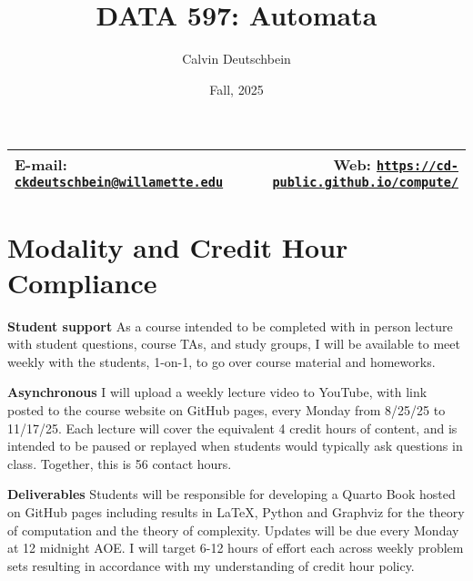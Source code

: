 \documentclass[11pt]{article}
\title{DATA 597: Automata}
\author{Calvin Deutschbein}
\date{Fall, 2025}
\newcommand{\blankline}{\quad\pagebreak[2]}
\begin{document}
\maketitle

\blankline

\begin{tabular*}{.93\textwidth}{@{\extracolsep{\fill}}lr}


E-mail: \href{mailto:ckdeutschbein@willamette.edu}{\tt\bf ckdeutschbein@willamette.edu} & Web: \href{https://cd-public.github.io/compute/}{\tt\bf https://cd-public.github.io/compute/}  \\
\hline
\end{tabular*}

\vspace{5 mm}


\section*{Modality and Credit Hour Compliance}

\bigskip

\textbf{Student support} As a course intended to be completed with in person lecture with student questions, course TAs, and study groups, I will be available to meet weekly with the students, 1-on-1, to go over course material and homeworks.

\bigskip

\textbf{Asynchronous} I will upload a weekly lecture video to YouTube, with link posted to the course website on GitHub pages, every Monday from 8/25/25 to 11/17/25. Each lecture will cover the equivalent 4 credit hours of content, and is intended to be paused or replayed when students would typically ask questions in class. Together, this is 56 contact hours.

\bigskip

\textbf{Deliverables} Students will be responsible for developing a Quarto Book hosted on GitHub pages including results in LaTeX, Python and Graphviz for the theory of computation and the theory of complexity. Updates will be due every Monday at 12 midnight AOE. I will target 6-12 hours of effort each across weekly problem sets resulting in accordance with my understanding of credit hour policy.
\end{document}
